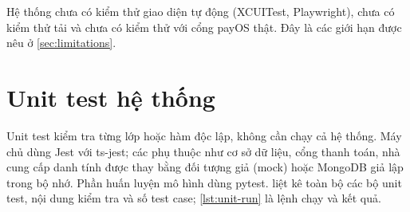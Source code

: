 Hệ thống chưa có kiểm thử giao diện tự động (XCUITest, Playwright), chưa có kiểm thử tải và chưa có kiểm thử với cổng payOS thật. Đây là các giới hạn được nêu ở \cref{sec:limitations}.

\section{Unit test hệ thống}\label{sec:unit-tests}

Unit test kiểm tra từng lớp hoặc hàm độc lập, không cần chạy cả hệ thống. Máy chủ dùng Jest với ts-jest; các phụ thuộc như cơ sở dữ liệu, cổng thanh toán, nhà cung cấp danh tính được thay bằng đối tượng giả (mock) hoặc MongoDB giả lập trong bộ nhớ. Phần huấn luyện mô hình dùng pytest.  liệt kê toàn bộ các bộ unit test, nội dung kiểm tra và số test case; \cref{lst:unit-run} là lệnh chạy và kết quả.

